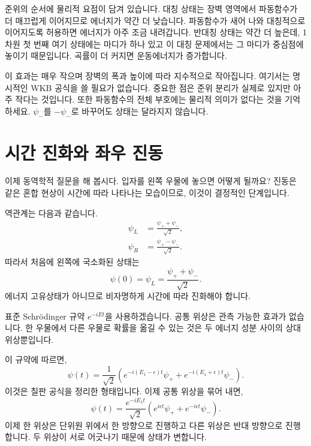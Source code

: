 준위의 순서에 물리적 요점이 담겨 있습니다. 대칭 상태는 장벽 영역에서 파동함수가 더 매끄럽게 이어지므로 에너지가 약간 더 낮습니다. 파동함수가 새어 나와 대칭적으로 이어지도록 허용하면 에너지가 아주 조금 내려갑니다. 반대칭 상태는 약간 더 높은데, 1차원 첫 번째 여기 상태에는 마디가 하나 있고 이 대칭 문제에서는 그 마디가 중심점에 놓이기 때문입니다. 곡률이 더 커지면 운동에너지가 증가합니다.

이 효과는 매우 작으며 장벽의 폭과 높이에 따라 지수적으로 작아집니다. 여기서는 명시적인 WKB 공식을 쓸 필요가 없습니다. 중요한 점은 준위 분리가 실제로 있지만 아주 작다는 것입니다. 또한 파동함수의 전체 부호에는 물리적 의미가 없다는 것을 기억하세요. \(\psi_-\)를 \(-\psi_-\)로 바꾸어도 상태는 달라지지 않습니다.

\section{시간 진화와 좌우 진동}

이제 동역학적 질문을 해 봅시다. 입자를 왼쪽 우물에 놓으면 어떻게 될까요? 진동은 같은 혼합 현상이 시간에 따라 나타나는 모습이므로, 이것이 결정적인 단계입니다.

역관계는 다음과 같습니다.
\begin{align}
\psi_L &= \frac{\psi_+ + \psi_-}{\sqrt{2}},\\
\psi_R &= \frac{\psi_+ - \psi_-}{\sqrt{2}}.
\end{align}
따라서 처음에 왼쪽에 국소화된 상태는
\begin{equation}
\psi(0)=\psi_L=\frac{\psi_+ + \psi_-}{\sqrt{2}}.
\end{equation}
에너지 고유상태가 아니므로 비자명하게 시간에 따라 진화해야 합니다.

표준 Schr\"odinger 규약 \(e^{-iEt}\)을 사용하겠습니다. 공통 위상은 관측 가능한 효과가 없습니다. 한 우물에서 다른 우물로 확률을 옮길 수 있는 것은 두 에너지 성분 사이의 상대 위상뿐입니다.

이 규약에 따르면,
\begin{equation}
\psi(t)=\frac{1}{\sqrt{2}}\left(e^{-i(E_1-\epsilon)t}\psi_+ + e^{-i(E_1+\epsilon)t}\psi_-\right).
\end{equation}
이것은 칠판 공식을 정리한 형태입니다. 이제 공통 위상을 묶어 내면,
\begin{equation}
\psi(t)=\frac{e^{-iE_1 t}}{\sqrt{2}}\left(e^{i\epsilon t}\psi_+ + e^{-i\epsilon t}\psi_-\right).
\end{equation}
이제 한 위상은 단위원 위에서 한 방향으로 진행하고 다른 위상은 반대 방향으로 진행합니다. 두 위상이 서로 어긋나기 때문에 상태가 변합니다.

